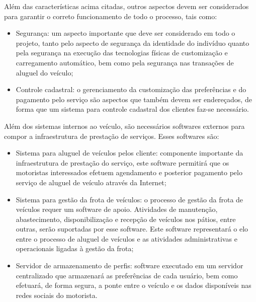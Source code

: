 \documentclass[12pt,journal,compsoc]{IEEEtran}
\begin{document}
Além das características acima citadas, outros aspectos devem ser considerados para garantir o correto funcionamento de todo o processo, tais como:

\begin{itemize}

\item Segurança: um aspecto importante que deve ser considerado em todo o projeto, tanto pelo aspecto de segurança da identidade do indivíduo quanto pela segurança na execução das tecnologias físicas de customização e carregamento automático, bem como pela segurança nas transações de aluguel do veículo;

\item Controle cadastral: o gerenciamento da customização das preferências e do pagamento pelo serviço são aspectos que também devem ser endereçados, de forma que um sistema para controle cadastral dos clientes faz-se necessário.

\end{itemize}

Além dos sistemas internos ao veículo, são necessários softwares externos para compor a infraestrutura de prestação de serviços. Esses softwares são:

\begin{itemize}

\item Sistema para aluguel de veículos pelos cliente: componente importante da infraestrutura de prestação do serviço, este software permitirá que os motoristas interessados efetuem agendamento e posterior pagamento pelo serviço de aluguel de veículo através da Internet;

\item Sistema para gestão da frota de veículos: o processo de gestão da frota de veículos requer um software de apoio. Atividades de manutenção, abastecimento, disponibilização e recepção de veículos nos pátios, entre outras, serão suportadas por esse software. Este software representará o elo entre o processo de aluguel de veículos e as atividades administrativas e operacionais ligadas à gestão da frota;

\item Servidor de armazenamento de perfis: software executado em um servidor centralizado que armazenará as preferências de cada usuário, bem como efetuará, de forma segura, a ponte entre o veículo e os dados disponíveis nas redes sociais do motorista.

\end{itemize}
\end{document}
